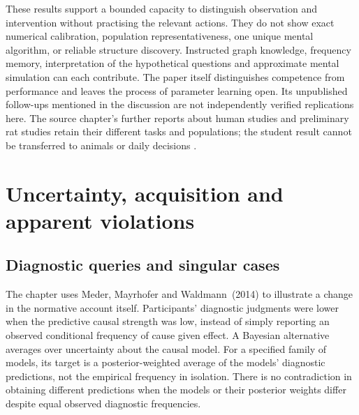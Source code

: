 These results support a bounded capacity to distinguish observation
and intervention without practising the relevant actions. They do not
show exact numerical calibration, population representativeness, one
unique mental algorithm, or reliable structure discovery. Instructed
graph knowledge, frequency memory, interpretation of the hypothetical
questions and approximate mental simulation can each contribute.
The paper itself distinguishes competence from performance and leaves
the process of parameter learning open. Its unpublished follow-ups
mentioned in the discussion are not independently verified replications
here. The source chapter's further reports about human studies and
preliminary rat studies retain their different tasks and populations;
the student result cannot be transferred to animals or daily decisions
\cite[p.~442]{Waldmann2021EverydayCausal}
\cite[pp.~78--79]{MederHagmayerWaldmann2008Interventional}.

\section{Uncertainty, acquisition and apparent violations}
\label{sec:p19-rat72-acquisition}

\subsection{Diagnostic queries and singular cases}

The chapter uses Meder, Mayrhofer and Waldmann~(2014) to illustrate a
change in the normative account itself. Participants' diagnostic
judgments were lower when the predictive causal strength was low,
instead of simply reporting an observed conditional frequency of cause
given effect. A Bayesian alternative averages over uncertainty about
the causal model. For a specified family of models, its target is a
posterior-weighted average of the models' diagnostic predictions, not
the empirical frequency in isolation. There is no contradiction in
obtaining different predictions when the models or their posterior
weights differ despite equal observed diagnostic frequencies.

